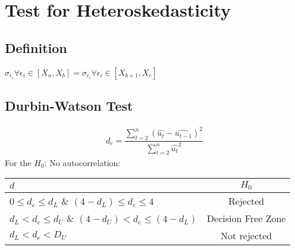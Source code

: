 \section{Test for Heteroskedasticity}
\subsection{Definition} $\sigma_{\epsilon_i} \forall  \epsilon_i \in [X_a, X_b] = \sigma_{\epsilon_i} \forall  \epsilon_i \in [X_{b+1}, X_c]$
\subsection{Durbin-Watson Test}
\begin{align}
	d_e = \dfrac{\sum_{t=2}^{n} (\hat{u_t}-\hat{u_{t-1}})^2}{\sum_{t=2}^{n} \hat{u_t}^2}
\end{align}
For the $H_0$: No autocorrelation:
\begin{table}[!h]
	\centering
	\begin{tabular}{l|c}
		$d$ & $H_0$\\
		\hline
		$0 \leq d_e \leq d_L$ \& $(4-d_L) \leq d_e \leq 4$ & Rejected\\
		$d_L < d_e \leq d_U$ \& $(4-d_U) < d_e \leq (4-d_L)$ & Decision Free Zone\\
		$d_L < d_e < D_U$ & Not rejected
	\end{tabular}
\end{table}